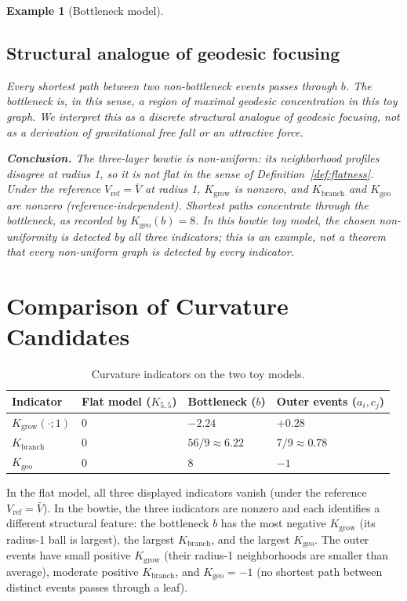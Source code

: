 \documentclass[12pt]{article}
\newtheorem{example}[theorem]{Example}
\begin{document}
\begin{example}[Bottleneck model]
\subsection*{Structural analogue of geodesic focusing}

Every shortest path between two non-bottleneck events passes through $b$. The bottleneck is, in this sense, a region of maximal geodesic concentration in this toy graph. We interpret this as a discrete structural analogue of geodesic focusing, not as a derivation of gravitational free fall or an attractive force.

\textbf{Conclusion.} The three-layer bowtie is non-uniform: its neighborhood profiles disagree at radius 1, so it is not flat in the sense of Definition~\ref{def:flatness}. Under the reference $V_{\mathrm{ref}} = \bar V$ at radius 1, $K_{\mathrm{grow}}$ is nonzero, and $K_{\mathrm{branch}}$ and $K_{\mathrm{geo}}$ are nonzero (reference-independent). Shortest paths concentrate through the bottleneck, as recorded by $K_{\mathrm{geo}}(b) = 8$. In this bowtie toy model, the chosen non-uniformity is detected by all three indicators; this is an example, not a theorem that every non-uniform graph is detected by every indicator.
\end{example}

\section{Comparison of Curvature Candidates}\label{sec:compare}

\begin{table}[ht]
\centering
\caption{Curvature indicators on the two toy models.}
\label{tab:curvature}
\begin{tabular}{@{}llll@{}}
\toprule
Indicator & Flat model ($K_{5,5}$) & Bottleneck ($b$) & Outer events ($a_i, c_j$) \\
\midrule
$K_{\mathrm{grow}}(\cdot; 1)$ & $0$ & $-2.24$ & $+0.28$ \\
$K_{\mathrm{branch}}$ & $0$ & $56/9 \approx 6.22$ & $7/9 \approx 0.78$ \\
$K_{\mathrm{geo}}$ & $0$ & $8$ & $-1$ \\
\bottomrule
\end{tabular}
\end{table}

In the flat model, all three displayed indicators vanish (under the reference $V_{\mathrm{ref}} = \bar V$). In the bowtie, the three indicators are nonzero and each identifies a different structural feature: the bottleneck $b$ has the most negative $K_{\mathrm{grow}}$ (its radius-1 ball is largest), the largest $K_{\mathrm{branch}}$, and the largest $K_{\mathrm{geo}}$. The outer events have small positive $K_{\mathrm{grow}}$ (their radius-1 neighborhoods are smaller than average), moderate positive $K_{\mathrm{branch}}$, and $K_{\mathrm{geo}} = -1$ (no shortest path between distinct events passes through a leaf).
\end{document}
